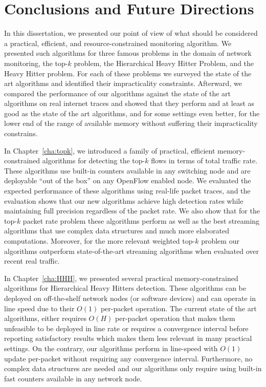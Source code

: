 \chapter{Conclusions and Future Directions}
\label{chap:conclusion}

In this dissertation, we presented our point of view of what should be considered a practical, efficient, and resource-constrained monitoring algorithm. We presented such algorithms for three famous problems in the domain of network monitoring, the top-$k$ problem, the Hierarchical Heavy Hitter Problem, and the Heavy Hitter problem. For each of these problems we surveyed the state of the art algorithms and identified their impracticality constraints. Afterward, we compared the performance of our algorithms against the state of the art algorithms on real internet traces and showed that they perform and at least as good as the state of the art algorithms, and for some settings even better, for the lower end of the range of available memory without suffering their impracticality constrains. 

In Chapter~\ref{cha:topk}, we introduced a family of practical, efficient memory-constrained algorithms for detecting the top-$k$ flows in terms of total traffic rate. These algorithms use built-in counters available in any switching node and are deployable “out of the box” on any OpenFlow enabled node. We evaluated the expected performance of these algorithms using real-life packet traces, and the evaluation shows that our new algorithms achieve high detection rates while maintaining full precision regardless of the packet rate. We also show that for the top-$k$ packet rate problem these algorithms perform as well as the best streaming algorithms that use complex data structures and much more elaborated computations. Moreover, for the more relevant weighted top-$k$ problem our algorithms outperform state-of-the-art streaming algorithms when evaluated over recent real traffic. 

In Chapter~\ref{cha:HHH}, we presented several practical memory-constrained algorithms for Hierarchical Heavy Hitters detection. These algorithms can be deployed on off-the-shelf network nodes (or software devices) and can operate in line speed due to their $O(1)$ per-packet operation. The current state of the art algorithms, either requires $O(H)$ per-packet operation that makes them unfeasible to be deployed in line rate or requires a convergence interval before reporting satisfactory results which makes them less relevant in many practical settings. On the contrary, our algorithms perform in line-speed with $O(1)$ update per-packet without requiring any convergence interval. Furthermore, no complex data structures are needed and our algorithms only require using built-in fast counters available in any network node.

